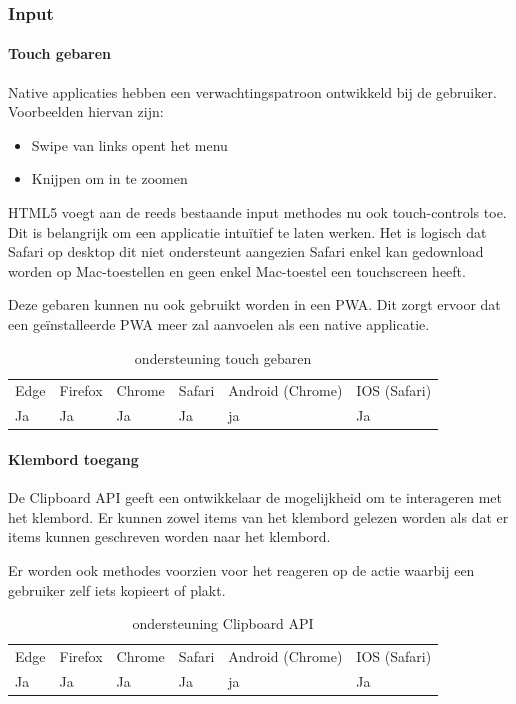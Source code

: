 \subsubsection{Input}

\paragraph{Touch gebaren}

Native applicaties hebben een verwachtingspatroon ontwikkeld bij de gebruiker. Voorbeelden hiervan zijn:

 \begin{itemize}
	\item	Swipe van links opent het menu
	\item	Knijpen om in te zoomen
\end{itemize}

HTML5 voegt aan de reeds bestaande input methodes nu ook touch-controls toe. Dit is belangrijk om een applicatie intuïtief te laten werken. Het is logisch dat Safari op desktop dit niet ondersteunt aangezien Safari enkel kan gedownload worden op Mac-toestellen en geen enkel Mac-toestel een touchscreen heeft.

Deze gebaren kunnen nu ook gebruikt worden in een PWA. Dit zorgt ervoor dat een geïnstalleerde PWA meer zal aanvoelen als een native applicatie.

\begin{table}[H]
	\centering
	\begin{tabular}{llllll}
		Edge & Firefox & Chrome & Safari & Android (Chrome) & IOS (Safari) \\
		Ja   & Ja      &  Ja     & Ja     & ja               & Ja          
	\end{tabular}	
	\caption{ondersteuning touch gebaren}
	\label{ondersteuning touch gebaren}
\end{table}	

\paragraph{Klembord toegang}
De Clipboard API \autocite{Kacmarcik2020} geeft een ontwikkelaar de mogelijkheid om te interageren met het klembord. Er kunnen zowel items van het klembord gelezen worden als dat er items kunnen geschreven worden naar het klembord.

Er worden ook methodes voorzien voor het reageren op de actie waarbij een gebruiker zelf iets kopieert of plakt. 

\begin{table}[H]
	\centering
	\begin{tabular}{llllll}
		Edge & Firefox & Chrome & Safari & Android (Chrome) & IOS (Safari) \\
		Ja   & Ja      &  Ja     & Ja     & ja               & Ja          
	\end{tabular}	
	\caption{ondersteuning Clipboard API}
	\label{ondersteuning Clipboard API}
\end{table}	



